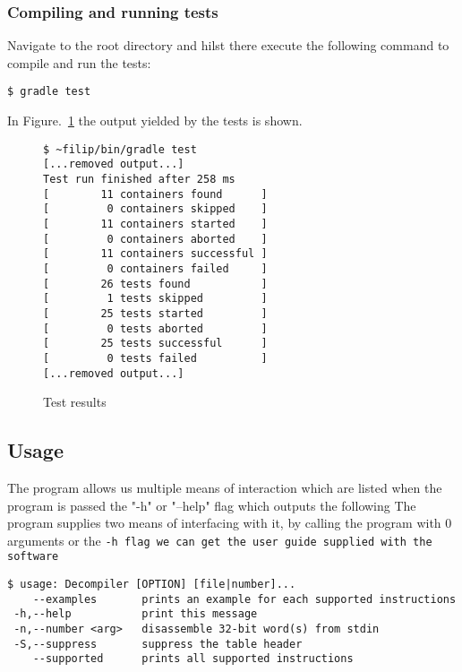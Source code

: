\subsubsection{Compiling and running tests}

Navigate to the root directory and hilst there execute the following
command to compile and run the tests:

\begin{lstlisting}[style=plain]
$ gradle test
\end{lstlisting}

In Figure.~\ref{fig:tests} the output yielded by the tests is shown.

\begin{figure}[htpb]
\begin{lstlisting}[style=plain]
$ ~filip/bin/gradle test             
[...removed output...]
Test run finished after 258 ms
[        11 containers found      ]
[         0 containers skipped    ]
[        11 containers started    ]
[         0 containers aborted    ]
[        11 containers successful ]
[         0 containers failed     ]
[        26 tests found           ]
[         1 tests skipped         ]
[        25 tests started         ]
[         0 tests aborted         ]
[        25 tests successful      ]
[         0 tests failed          ]
[...removed output...]
\end{lstlisting}
\caption{Test results}
\label{fig:tests}
\end{figure}

\subsection{Usage}

The program allows us multiple means of interaction which are listed
when the program is passed the "-h" or "--help" flag which outputs the following
The program supplies two means of interfacing with it, by calling
the program with 0 arguments or the \tt{-h} flag we can get the
user guide supplied with the software

\begin{lstlisting}[style=plain]
$ usage: Decompiler [OPTION] [file|number]...
    --examples       prints an example for each supported instructions
 -h,--help           print this message
 -n,--number <arg>   disassemble 32-bit word(s) from stdin
 -S,--suppress       suppress the table header
    --supported      prints all supported instructions
\end{lstlisting}

